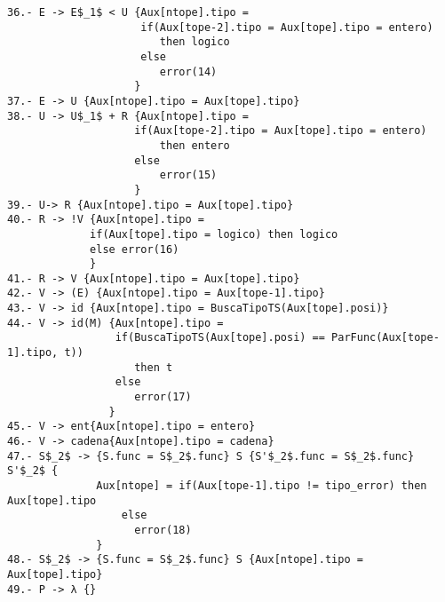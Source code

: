 \documentclass[a4paper, 12pt]{article}
\begin{document}
\begin{lstlisting}[style=EstadosAutomataST]
36.- E -> E$_1$ < U {Aux[ntope].tipo =
                     if(Aux[tope-2].tipo = Aux[tope].tipo = entero)
                        then logico
                     else
                        error(14)
                    }
37.- E -> U {Aux[ntope].tipo = Aux[tope].tipo}
38.- U -> U$_1$ + R {Aux[ntope].tipo =
                    if(Aux[tope-2].tipo = Aux[tope].tipo = entero)
                        then entero
                    else
                        error(15)
                    }
39.- U-> R {Aux[ntope].tipo = Aux[tope].tipo}
40.- R -> !V {Aux[ntope].tipo =
             if(Aux[tope].tipo = logico) then logico
             else error(16)
             }
41.- R -> V {Aux[ntope].tipo = Aux[tope].tipo}
42.- V -> (E) {Aux[ntope].tipo = Aux[tope-1].tipo}
43.- V -> id {Aux[ntope].tipo = BuscaTipoTS(Aux[tope].posi)}
44.- V -> id(M) {Aux[ntope].tipo =
                 if(BuscaTipoTS(Aux[tope].posi) == ParFunc(Aux[tope-1].tipo, t))
                    then t
                 else
                    error(17)
                }
45.- V -> ent{Aux[ntope].tipo = entero}
46.- V -> cadena{Aux[ntope].tipo = cadena}
47.- S$_2$ -> {S.func = S$_2$.func} S {S'$_2$.func = S$_2$.func} S'$_2$ {
              Aux[ntope] = if(Aux[tope-1].tipo != tipo_error) then Aux[tope].tipo
                  else
                    error(18)
              }
48.- S$_2$ -> {S.func = S$_2$.func} S {Aux[ntope].tipo = Aux[tope].tipo}
49.- P -> λ {}

\end{lstlisting}
\end{document}
